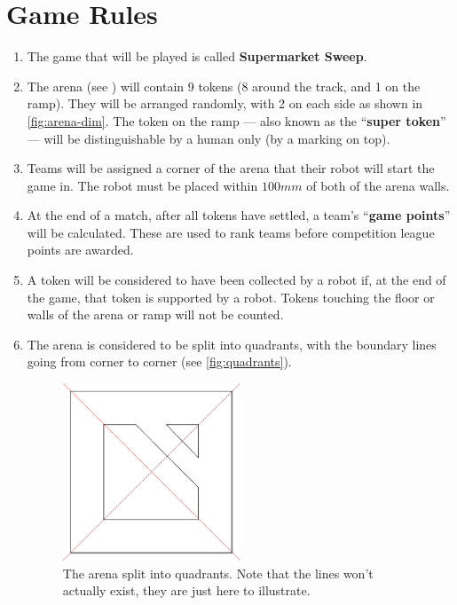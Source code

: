 \section {Game Rules}
\label{game-rules}

\begin{enumerate}
\item The game that will be played is called \textbf{Supermarket Sweep}.
\item The arena (see ) will contain 9 tokens (8 around the track, and 1 on the ramp).
 They will be arranged randomly, with 2 on each side as shown in \autoref{fig:arena-dim}.
 The token on the ramp --- also known as the ``\textbf{super token}'' --- will be distinguishable by a human only (by a marking on top).
\item Teams will be assigned a corner of the arena that their robot will start the game in.
 The robot must be placed within $100mm$ of both of the arena walls.
\item At the end of a match, after all tokens have settled, a team's ``\textbf{game points}'' will be calculated.
 These are used to rank teams before competition league points are awarded.
\item A token will be considered to have been collected by a robot if, at the end of the game, that token is supported by a robot.
 Tokens touching the floor or walls of the arena or ramp will not be counted.

\item The arena is considered to be split into quadrants, with the boundary lines going from corner to corner (see \autoref{fig:quadrants}).

\begin{figure}
\begin{center}
  \includegraphics[keepaspectratio, clip, width=0.5\textwidth]{./images/quadrants.pdf}
  \caption{\label{fig:quadrants}The arena split into quadrants.
           Note that the lines won't actually exist, they are just here to illustrate.}
\end{center}
\end{figure}


\end{enumerate}
